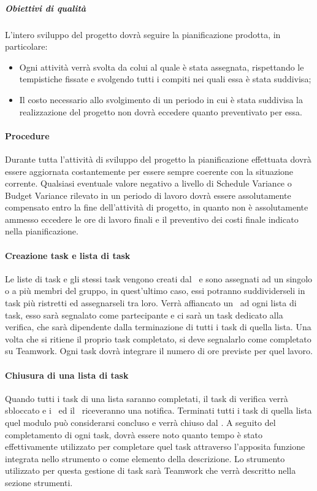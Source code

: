 \documentclass[../NormeDiProgetto_v4.0.0.tex]{subfiles}
\begin{document}
			\subparagraph{Obiettivi di qualità}
			L'intero sviluppo del progetto dovrà seguire la pianificazione prodotta, in particolare:
			\begin{itemize}
				\item Ogni attività verrà svolta da colui al quale è stata assegnata, rispettando le tempistiche fissate e svolgendo tutti i compiti nei quali essa è stata suddivisa;
				\item Il costo necessario allo svolgimento di un periodo in cui è stata suddivisa la realizzazione del progetto non dovrà eccedere quanto preventivato per essa.
			\end{itemize}
	
			\paragraph{Procedure}
			Durante tutta l'attività di sviluppo del progetto la pianificazione effettuata dovrà essere aggiornata costantemente per essere sempre coerente con la situazione corrente. Qualsiasi eventuale valore negativo a livello di Schedule Variance o Budget Variance rilevato in un periodo di lavoro dovrà essere assolutamente compensato entro la fine dell'attività di progetto, in quanto non è assolutamente ammesso eccedere le ore di lavoro finali e il preventivo dei costi finale indicato nella pianificazione.

			\paragraph{Creazione task e lista di task}
			Le liste di task e gli stessi task vengono creati dal \responsabilediprogetto\ e sono assegnati ad un singolo o a più membri del gruppo, in quest'ultimo caso, essi potranno suddividerseli in task più ristretti ed assegnarseli tra loro.
			Verrà affiancato un \verificatore\ ad ogni lista di task, esso sarà segnalato come partecipante e ci sarà un task dedicato alla verifica, che sarà dipendente dalla terminazione di tutti i task di quella lista.
			Una volta che si ritiene il proprio task completato, si deve segnalarlo come completato su Teamwork.
			Ogni task dovrà integrare il numero di ore previste per quel lavoro.

			\paragraph{Chiusura di una lista di task}
			Quando tutti i task di una lista saranno completati, il task di verifica verrà sbloccato e i \verificatori\ ed il \responsabilediprogetto\ riceveranno una notifica.
			Terminati tutti i task di quella lista quel modulo può considerarsi concluso e verrà chiuso dal \responsabilediprogetto.
			A seguito del completamento di ogni task, dovrà essere noto quanto tempo è stato effettivamente utilizzato per completare quel task attraverso l'apposita funzione integrata nello strumento o come elemento della descrizione.
			Lo strumento utilizzato per questa gestione di task sarà Teamwork che verrà descritto nella sezione strumenti.
		
\end{document}
